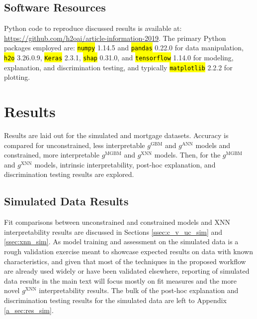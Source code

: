 \documentclass[information,article,accept,moreauthors,pdftex]{Definitions/mdpi}
\begin{document}
{{{%
\subsection{Software Resources}\label{ssec:soft}



Python code to reproduce discussed results is available at: {\url{https://github.com/h2oai/article-information-2019}}. The primary Python packages employed are:  
{\texttt{\hl{numpy}}} 1.14.5 and 
{\texttt{\hl{pandas}}} 0.22.0 for data manipulation, 
{\texttt{\hl{h2o}}} 3.26.0.9, 
{\texttt{\hl{Keras}}} 2.3.1, 
{\texttt{\hl{shap}}} 0.31.0, and 
{\texttt{\hl{tensorflow}}} 1.14.0 for modeling, explanation, and discrimination testing, and typically 
{\texttt{\hl{matplotlib}}} 2.2.2 for plotting. 


\section{Results}\label{sec:res}

Results are laid out for the simulated and mortgage datasets. Accuracy is compared for unconstrained, less interpretable $g^{\text{GBM}}$ and $g^{\text{ANN}}$ models and constrained, more interpretable $g^{\text{MGBM}}$ and $g^{\text{XNN}}$ models. Then, for the  $g^{\text{MGBM}}$ and $g^{\text{XNN}}$ models, intrinsic interpretability, post-hoc explanation, and discrimination testing results are explored.

\subsection{Simulated Data Results}

Fit comparisons between unconstrained and constrained models and XNN interpretability results are discussed in Sections \ref{ssec:c_v_uc_sim} and \ref{ssec:xnn_sim}. As model training and assessment on the simulated data is a rough validation exercise meant to showcase expected results on data with known characteristics, and given that most of the techniques in the proposed workflow are already used widely or have been validated elsewhere, reporting of simulated data results in the main text will focus mostly on fit measures and the more novel $g^\text{XNN}$ interpretability results. The bulk of the post-hoc explanation and discrimination testing results for the simulated data are left to Appendix \ref{a_sec:res_sim}. 

}}}
\end{document}
